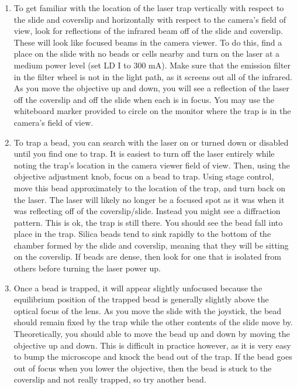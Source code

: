 \documentclass{../lab}
\begin{document}
\begin{enumerate}
    \item To get familiar with the location of the laser trap vertically with respect to the slide and coverslip and horizontally with respect to the camera's field of view, look for reflections of the infrared beam off of the slide and coverslip. These will look like focused beams in the camera viewer. To do this, find a place on the slide with no beads or cells nearby and turn on the laser at a medium power level (set LD I to 300 mA). Make sure that the emission filter in the filter wheel is not in the light path, as it screens out all of the infrared. As you move the objective up and down, you will see a reflection of the laser off the coverslip and off the slide when each is in focus. You may use the whiteboard marker provided to circle on the monitor where the trap is in the camera's field of view. 

    \item To trap a bead, you can search with the laser on or turned down or disabled until you find one to trap. It is easiest to turn off the laser entirely while noting the trap's location in the camera viewer field of view. Then, using the objective adjustment knob, focus on a bead to trap. Using stage control, move this bead approximately to the location of the trap, and turn back on the laser. The laser will likely no longer be a focused spot as it was when it was reflecting off of the coverslip/slide. Instead you might see a diffraction pattern. This is ok, the trap is still there. You should see the bead fall into place in the trap. Silica beads tend to sink rapidly to the bottom of the chamber formed by the slide and coverslip, meaning that they will be sitting on the coverslip. If beads are dense, then look for one that is isolated from others before turning the laser power up.

    \item Once a bead is trapped, it will appear slightly unfocused because the equilibrium position of the trapped bead is generally slightly above the optical focus of the lens. As you move the slide with the joystick, the bead should remain fixed by the trap while the other contents of the slide move by. Theoretically, you should able to move the bead up and down by moving the objective up and down. This is difficult in practice however, as it is very easy to bump the microscope and knock the bead out of the trap. If the bead goes out of focus when you lower the objective, then the bead is stuck to the coverslip and not really trapped, so try another bead.


\end{enumerate}
\end{document}
